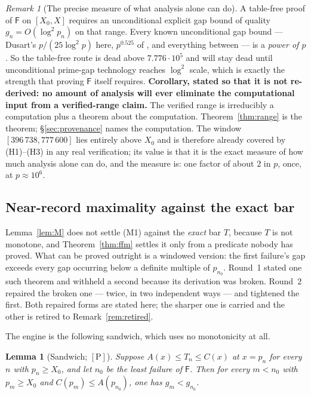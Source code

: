 \documentclass[11pt,a4paper]{article}
\theoremstyle{plain}
\newtheorem{lemma}[theorem]{Lemma}
\theoremstyle{definition}
\theoremstyle{remark}
\newtheorem{remark}[theorem]{Remark}
\newcommand{\cP}{{[\mathrm{P}]}}
\newcommand{\Fb}{\mathsf{F}}
\begin{document}
\begin{remark}[The precise measure of what analysis alone can do]
\label{rem:analysis-alone}
A table-free proof of $\Fb$ on $[X_0, X]$ requires an unconditional explicit gap bound of
quality $g_n = O(\log^2 p_n)$ on that range. Every known unconditional gap bound --- Dusart's
$p/(25\log^2 p)$ here, $p^{0.525}$ of \cite{baker2001difference}, and everything between ---
is a \emph{power of $p$}. So the table-free route is dead above $7.776\cdot10^5$ and will stay
dead until unconditional prime-gap technology reaches $\log^2$ scale, which is exactly the
strength that proving $\Fb$ itself requires. \textbf{Corollary, stated so that it is not
re-derived: no amount of analysis will ever eliminate the computational input from a
verified-range claim.} The verified range is irreducibly a computation plus a theorem about the
computation. Theorem~\ref{thm:range} is the theorem; \S\ref{sec:provenance} names the
computation. The window $[396\,738, 777\,600]$ lies entirely above $X_0$ and is therefore
already covered by (H1)--(H3) in any real verification; its value is that it is the exact
measure of how much analysis alone can do, and the measure is: one factor of about $2$ in $p$,
once, at $p \approx 10^6$.
\end{remark}

\subsection{Near-record maximality against the exact bar}
\label{sec:nearrecord}

Lemma~\ref{lem:M} does not settle (M1) against the \emph{exact} bar $T$, because $T$ is not
monotone, and Theorem~\ref{thm:ffm} settles it only from a predicate nobody has proved. What
can be proved outright is a windowed version: the first failure's gap exceeds every gap
occurring below a definite multiple of $p_{n_0}$. Round~1 stated one such theorem and withheld
a second because its derivation was broken. Round~2 repaired the broken one --- twice, in two
independent ways --- and tightened the first. Both repaired forms are stated here; the sharper
one is carried and the other is retired to Remark~\ref{rem:retired}.

The engine is the following sandwich, which uses no monotonicity at all.

\begin{lemma}[Sandwich; $\cP$]
\label{lem:W}
Suppose $A(x) \le T_n \le C(x)$ at $x = p_n$ for every $n$ with $p_n \ge X_0$, and let $n_0$ be
the least failure of $\Fb$. Then for every $m < n_0$ with $p_m \ge X_0$ and
$C(p_m) \le A(p_{n_0})$, one has $g_m < g_{n_0}$.
\end{lemma}
\end{document}
